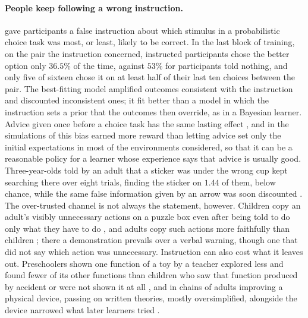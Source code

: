 \paragraph{People keep following a wrong instruction.} \citet{doll2009} gave participants a false instruction about which stimulus in a probabilistic choice task was most, or least, likely to be correct. In the last block of training, on the pair the instruction concerned, instructed participants chose the better option only $36.5\%$ of the time, against $53\%$ for participants told nothing, and only five of sixteen chose it on at least half of their last ten choices between the pair. The best-fitting model amplified outcomes consistent with the instruction and discounted inconsistent ones; it fit better than a model in which the instruction sets a prior that the outcomes then override, as in a Bayesian learner. Advice given once before a choice task has the same lasting effect \citep{biele2009, biele2011}, and in the simulations of \citet{biele2011} this bias earned more reward than letting advice set only the initial expectations in most of the environments considered, so that it can be a reasonable policy for a learner whose experience says that advice is usually good. Three-year-olds told by an adult that a sticker was under the wrong cup kept searching there over eight trials, finding the sticker on $1.44$ of them, below chance, while the same false information given by an arrow was soon discounted \citep{jaswal2010}. The over-trusted channel is not always the statement, however. Children copy an adult's visibly unnecessary actions on a puzzle box even after being told to do only what they have to do \citep{lyons2007}, and adults copy such actions more faithfully than children \citep{mcguigan2011}; there a demonstration prevails over a verbal warning, though one that did not say which action was unnecessary. Instruction can also cost what it leaves out. Preschoolers shown one function of a toy by a teacher explored less and found fewer of its other functions than children who saw that function produced by accident or were not shown it at all \citep{bonawitz2011}, and in chains of adults improving a physical device, passing on written theories, mostly oversimplified, alongside the device narrowed what later learners tried \citep{derex2019}.

